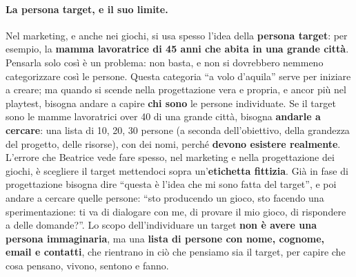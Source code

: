 \paragraph{La persona target, e il suo limite.} Nel marketing, e anche nei giochi, si
usa spesso l'idea della \textbf{persona target}: per esempio, la \textbf{mamma
lavoratrice di 45 anni che abita in una grande città}. Pensarla solo così è un
problema: non basta, e non si dovrebbero nemmeno categorizzare così le persone. Questa
categoria ``a volo d'aquila'' serve per iniziare a creare; ma quando si scende nella
progettazione vera e propria, e ancor più nel playtest, bisogna andare a capire
\textbf{chi sono} le persone individuate. Se il target sono le mamme lavoratrici over
40 di una grande città, bisogna \textbf{andarle a cercare}: una lista di 10, 20, 30
persone (a seconda dell'obiettivo, della grandezza del progetto, delle risorse), con
dei nomi, perché \textbf{devono esistere realmente}. L'errore che Beatrice vede fare
spesso, nel marketing e nella progettazione dei giochi, è scegliere il target
mettendoci sopra un'\textbf{etichetta fittizia}. Già in fase di progettazione bisogna
dire ``questa è l'idea che mi sono fatta del target'', e poi andare a cercare quelle
persone: ``sto producendo un gioco, sto facendo una sperimentazione: ti va di
dialogare con me, di provare il mio gioco, di rispondere a delle domande?''. Lo scopo
dell'individuare un target \textbf{non è avere una persona immaginaria}, ma una
\textbf{lista di persone con nome, cognome, email e contatti}, che rientrano in ciò
che pensiamo sia il target, per capire che cosa pensano, vivono, sentono e fanno.

